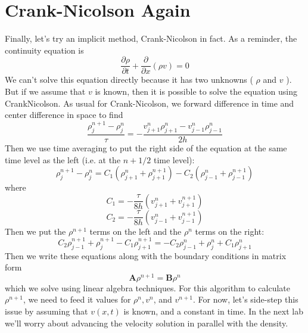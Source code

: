 \section*{Crank-Nicolson Again}

Finally, let\rq s try an implicit method, Crank-Nicolson in fact. As a reminder, the
continuity equation is
\begin{equation}\label{eq:1012}
\frac{\partial \rho}{\partial t}+\frac{\partial}{\partial x}(\rho v)=0
\end{equation}
We can\rq t solve this equation directly because it has two unknowns ( $\rho$ and $v$ ). But if we assume that $v$ is known, then it is possible to solve the equation using CrankNicolson. As usual for Crank-Nicolson, we forward difference in time and center difference in space to find
\begin{equation}\label{eq:1013}
\frac{\rho_{j}^{n+1}-\rho_{j}^{n}}{\tau}=-\frac{v_{j+1}^{n} \rho_{j+1}^{n}-v_{j-1}^{n} \rho_{j-1}^{n}}{2 h}
\end{equation}
Then we use time averaging to put the right side of the equation at the same time
level as the left (i.e. at the $n + 1/2$ time level):
\begin{equation}\label{eq:1014}
\rho_{j}^{n+1}-\rho_{j}^{n}=C_{1}\left(\rho_{j+1}^{n}+\rho_{j+1}^{n+1}\right)-C_{2}\left(\rho_{j-1}^{n}+\rho_{j-1}^{n+1}\right)
\end{equation}
where 
\begin{equation}\label{eq:1015}
C_{1}=-\frac{\tau}{8 h}\left(v_{j+1}^{n}+v_{j+1}^{n+1}\right)
\end{equation}
\begin{equation}\label{eq:1016}
C_{2}=-\frac{\tau}{8 h}\left(v_{j-1}^{n}+v_{j-1}^{n+1}\right)
\end{equation}
Then we put the $\rho^{n+1}$ terms on the left and the $\rho^n$ terms on the right:
\begin{equation}\label{eq:1017}
C_{2} \rho_{j-1}^{n+1}+\rho_{j}^{n+1}-C_{1} \rho_{j+1}^{n+1}=-C_{2} \rho_{j-1}^{n}+\rho_{j}^{n}+C_{1} \rho_{j+1}^{n}
\end{equation}
Then we write these equations along with the boundary conditions in matrix form
\begin{equation}\label{eq:1018}
\mathbf{A} \rho^{n+1}=\mathbf{B} \rho^{n}
\end{equation}
which we solve using linear algebra techniques. For this algorithm to calculate $\rho^{n+1}$, we need to feed it values for $\rho^{n}, v^{n}$, and $v^{n+1}$. For now, let\rq s side-step this issue by assuming that $v(x, t)$ is known, and a constant in time. In the next lab we\rq ll worry about advancing the velocity solution in parallel with the density.
